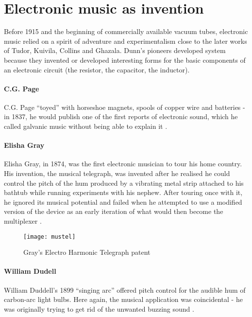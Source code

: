 \section{Electronic music as invention}

	Before 1915 and the beginning of commercially available vacuum tubes, electronic music relied on a spirit of adventure and experimentalism close to the later works of Tudor, Kuivila, Collins and Ghazala. Dunn's pioneers developed system because they invented or developed interesting forms for the basic components of an electronic circuit (the resistor, the capacitor, the inductor). 
	
\paragraph{C.G. Page}

	C.G. Page “toyed” with horseshoe magnets, spools of copper wire and batteries - in 1837, he would publish one of the first reports of electronic sound, which he called galvanic music without being able to explain it \cite{page1837}. 
	
\paragraph{Elisha Gray}

	Elisha Gray, in 1874, was the first electronic musician to tour his home country. His invention, the musical telegraph, was invented after he realised he could control the pitch of the hum produced by a vibrating metal strip attached to his bathtub while running experiments with his nephew. After touring once with it, he ignored its musical potential and failed when he attempted to use a modified version of the device as an early iteration of what would then become the multiplexer \cite{holmes2002}. 
	
	\begin{figure}[h!]
	  \caption{Gray's Electro Harmonic Telegraph patent}
	  \centering
	    \texttt{[image: mustel]}
	\end{figure}
	
\paragraph{William Dudell}

	William Duddell’s 1899 ``singing arc'' offered pitch control for the audible hum of carbon-arc light bulbs. Here again, the musical application was coincidental - he was originally trying to get rid of the unwanted buzzing sound \cite{nasmyth1908,holmes2002}. 
	
